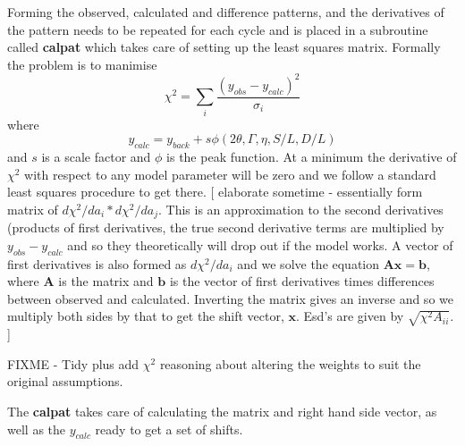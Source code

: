 \documentclass[10pt,a4paper,notitlepage]{article}
\newcommand{\code}[1]{\textbf{\textsf{#1}}} %
\begin{document}
Forming the observed, calculated and difference patterns, and the derivatives
of the pattern needs to be repeated for each cycle and is placed in a 
subroutine called \code{calpat} which takes care of setting up the 
least squares matrix.
Formally the problem is to manimise
\[ \chi^{2}=\sum_{i} \frac{ \left( y_{obs}-y_{calc} \right)^2}{\sigma_{i}} \]
where 
\[ y_{calc} = y_{back} + s \phi(2\theta,\Gamma,\eta,S/L,D/L) \]
and $s$ is a scale factor and $\phi$ is the peak function.
At a minimum the derivative of $\chi^2$ with respect to any model parameter
will be zero and we follow a standard least squares procedure to get there.
[ elaborate sometime - essentially form matrix of 
$d\chi^{2}/da_{i} * d\chi^{2}/da_{j}$. This is an approximation
to the second derivatives (products of first derivatives, the true second 
derivative terms are multiplied by $y_{obs}-y_{calc}$ and so they theoretically
will drop out if the model works. 
A vector of first derivatives is also formed as $d\chi^{2}/da_{i}$ and we
solve the equation $\mathbf{Ax}=\mathbf{b}$, where $\mathbf{A}$ is the
matrix and $\mathbf{b}$ is the vector of first derivatives times differences
between observed and calculated.
Inverting the matrix gives an inverse and so we multiply both sides by that
to get the shift vector, $\mathbf{x}$. Esd's are given by 
$\sqrt{\chi^{2}A_{ii}}$. ]

FIXME - Tidy plus add $\chi^2$ reasoning about altering the weights to suit
the original assumptions.

The \code{calpat} takes care of calculating the matrix and right hand side 
vector, as well as the $y_{calc}$ ready to get a set of shifts. 
\end{document}
